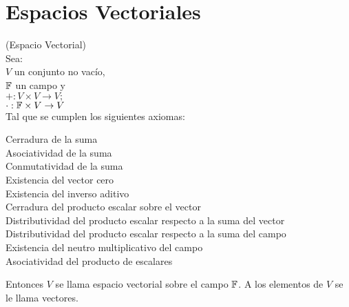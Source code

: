 \section{Espacios Vectoriales}
\begin{defin}
	(Espacio Vectorial)\\
Sea: \\
$V$ un conjunto no vac\'{i}o,\\ $\mathbb{F}$ un campo y \\  $+: V\times V \to V;$ \\$ \cdot : \mathbb{F}\times V \to V$ \\
Tal que se cumplen los siguientes axiomas:

\begin{description}
	\item[Cerradura de la suma]
\item[Asociatividad de la suma]
\item[Conmutatividad de la suma]
\item[Existencia del vector cero]
\item[Existencia del inverso aditivo]
\item[Cerradura del producto escalar sobre el vector]
\item[Distributividad del producto escalar respecto a la suma del vector]
\item[Distributividad del producto escalar respecto a la suma del campo ]
\item[Existencia del neutro multiplicativo del campo]
\item[Asociatividad del producto de escalares]
\end{description}

Entonces $V$ se llama espacio vectorial sobre el campo $\mathbb{F}$. A los elementos de $V$ se le llama vectores.

\begin{ejem}
$$
\end{enumerate}


\end{ejem}

\end{defin}
%
%

